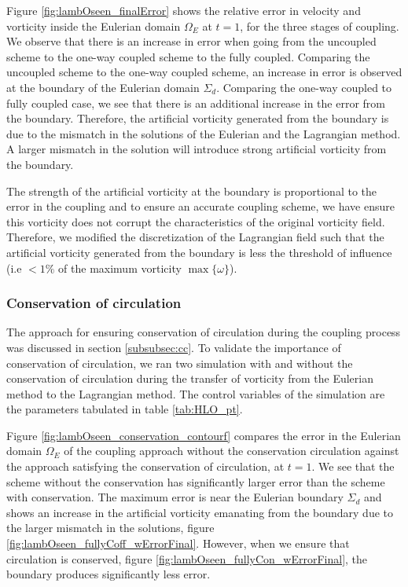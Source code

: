 Figure \ref{fig:lambOseen_finalError} shows the relative error in velocity and vorticity inside the Eulerian domain $\Omega_E$ at $t=1$, for the three stages of coupling. We observe that there is an increase in error when going from the uncoupled scheme to the one-way coupled scheme to the fully coupled. Comparing the uncoupled scheme to the one-way coupled scheme, an increase in error is observed at the boundary of the Eulerian domain $\Sigma_d$.  Comparing the one-way coupled to fully coupled case, we see that there is an additional increase in the error from the boundary. Therefore, the artificial vorticity generated from the boundary is due to the mismatch in the solutions of the Eulerian and the Lagrangian method. A larger mismatch in the solution will introduce strong artificial vorticity from the boundary.

The strength of the artificial vorticity at the boundary is proportional to the error in the coupling and to ensure an accurate coupling scheme, we have ensure this vorticity does not corrupt the characteristics of the original vorticity field. Therefore, we modified the discretization of the Lagrangian field such that the artificial vorticity generated from the boundary is less the threshold of influence (i.e $<1\%$ of the maximum vorticity $\max\{\omega\}$).

\subsubsection{Conservation of circulation}
\label{subsubsec:coc}

The approach for ensuring conservation of circulation during the coupling process was discussed in section \ref{subsubsec:cc}. To validate the importance of conservation of circulation, we ran two simulation with and without the conservation of circulation during the transfer of vorticity from the Eulerian method to the Lagrangian method. The control variables of the simulation are the parameters tabulated in table \ref{tab:HLO_pt}.

Figure \ref{fig:lambOseen_conservation_contourf} compares the error in the Eulerian domain $\Omega_E$ of the coupling approach without the conservation circulation against the approach satisfying the conservation of circulation, at $t=1$. We see that the scheme without the conservation has significantly larger error than the scheme with conservation. The maximum error is near the Eulerian boundary $\Sigma_d$ and shows an increase in the artificial vorticity emanating from the boundary due to the larger mismatch in the solutions, figure \ref{fig:lambOseen_fullyCoff_wErrorFinal}. However, when we ensure that circulation is conserved, figure \ref{fig:lambOseen_fullyCon_wErrorFinal}, the boundary produces significantly less error.

